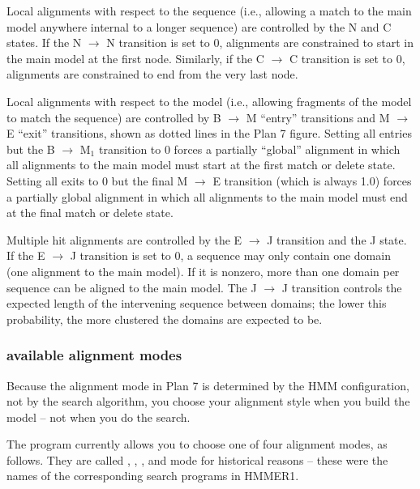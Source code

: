 Local alignments with respect to the sequence (i.e., allowing a match
to the main model anywhere internal to a longer sequence) are
controlled by the N and C states. If the N $\rightarrow$ N transition
is set to 0, alignments are constrained to start in the main model at
the first node. Similarly, if the C $\rightarrow$ C transition is set
to 0, alignments are constrained to end from the very last node.

Local alignments with respect to the model (i.e., allowing fragments
of the model to match the sequence) are controlled by B $\rightarrow$
M ``entry'' transitions and M $\rightarrow$ E ``exit'' transitions,
shown as dotted lines in the Plan 7 figure. Setting all entries but
the B $\rightarrow$ M$_1$ transition to 0 forces a partially
``global'' alignment in which all alignments to the main model must
start at the first match or delete state. Setting all exits to 0 but
the final M $\rightarrow$ E transition (which is always 1.0) forces a
partially global alignment in which all alignments to the main model
must end at the final match or delete state.

Multiple hit alignments are controlled by the E $\rightarrow$ J
transition and the J state. If the E $\rightarrow$ J transition is set
to 0, a sequence may only contain one domain (one alignment to the
main model). If it is nonzero, more than one domain per sequence can
be aligned to the main model. The J $\rightarrow$ J transition
controls the expected length of the intervening sequence between
domains; the lower this probability, the more clustered the domains
are expected to be.

\subsubsection{available alignment modes}

Because the alignment mode in Plan 7 is determined by the HMM
configuration, not by the search algorithm, you choose your alignment
style when you build the model -- not when you do the search.

The  program currently allows you to choose one of four
alignment modes, as follows. They are called ,
, , and  mode for historical
reasons -- these were the names of the corresponding search programs
in HMMER1.

